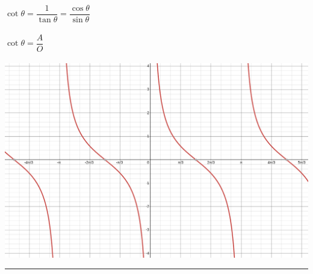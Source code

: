 \documentclass{article}
\begin{document}
\begin{multicols}{3}
    $\cot \theta = \dfrac{1}{\tan \theta} 
     = \dfrac{\cos \theta}{\sin \theta}$          \\\\
    $\cot \theta = \dfrac{A}{O}$                  \\\\
    \includegraphics[scale=0.15]{images/cot.png} 
\end{multicols}
\hrule
\end{document}
